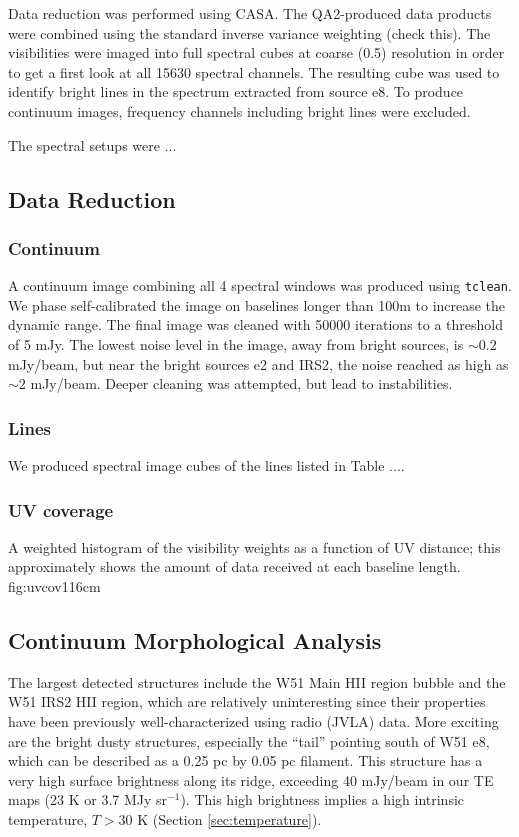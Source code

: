\documentclass{aa}
\begin{document}
Data reduction was performed using CASA.  The QA2-produced data products were
combined using the standard inverse variance weighting (check this).
The visibilities were imaged into full spectral cubes at coarse (0.5\arcsec)
resolution in order to get a first look at all 15630 spectral channels.  The
resulting cube was used to identify bright lines in the spectrum extracted
from source e8.  To produce continuum images, frequency channels including
bright lines were excluded.

The spectral setups were ...

\subsection{Data Reduction}
\subsubsection{Continuum}
A continuum image combining all 4 spectral windows was produced using
\texttt{tclean}.  We phase self-calibrated the image on baselines longer than
100m to increase the dynamic range.  The final image was cleaned with 50000
iterations to a threshold of 5 mJy.  The lowest noise level in the image, away
from bright sources, is $\sim0.2$ mJy/beam, but near the bright sources e2 and
IRS2, the noise reached as high as $\sim2$ mJy/beam.  Deeper cleaning was
attempted, but lead to instabilities.


\subsubsection{Lines}
We produced spectral image cubes of the lines listed in Table ....




\subsubsection{UV coverage}
{A weighted histogram of the visibility weights as a function of UV distance;
this approximately shows the amount of data received at each baseline length.}
{fig:uvcov}{1}{16cm}

\subsection{Continuum Morphological Analysis}
\label{sec:morphology}
The largest detected structures include the W51 Main HII region bubble and the
W51 IRS2 HII region, which are relatively uninteresting since their properties
have been previously well-characterized using radio (JVLA) data.  More exciting
are the bright dusty structures, especially the ``tail'' pointing south of W51
e8, which can be described as a 0.25 pc by 0.05 pc filament. This structure has
a very high surface brightness along its ridge, exceeding 40 mJy/beam in our TE
maps (23 K or 3.7 MJy sr$^{-1}$).  This high brightness implies a high
intrinsic temperature, $T>30$ K (Section \ref{sec:temperature}).
\end{document}
